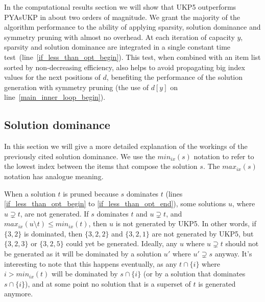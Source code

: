 \documentclass[runningheads,a4paper]{llncs}
\begin{document}
In the computational results section we will show that UKP5 outperforms PYAsUKP in about two orders of magnitude.
We grant the majority of the algorithm performance to the ability of applying sparsity, solution dominance and symmetry pruning with almost no overhead.
At each iteration of capacity \(y\), sparsity and solution dominance are integrated in a single constant time test~(line~\ref{if_less_than_opt_begin}).
This test, when combined with an item list sorted by non-decreasing efficiency, also helps to avoid propagating big index values for the next positions of \(d\), benefiting the performance of the solution generation with symmetry pruning (the use of \(d[y]\) on line~\ref{main_inner_loop_begin}).

\subsection{Solution dominance}

In this section we will give a more detailed explanation of the workings of the previously cited solution dominance. We use the \(min_{ix}(s)\) notation to refer to the lowest index between the items that compose the solution \(s\). The \(max_{ix}(s)\) notation has analogue meaning.

When a solution \(t\) is pruned because \(s\) dominates \(t\) (lines \ref{if_less_than_opt_begin} to \ref{if_less_than_opt_end}), some solutions \(u\), where \(u \supsetneq t\), are not generated. 
If \(s\) dominates \(t\) and \(u \supsetneq t\), and \(max_{ix}(u\setminus t) \leq min_{ix}(t)\), then \(u\) is not generated by UKP5. 
In other words, if \(\{3, 2\}\) is dominated, then \(\{3, 2, 2\}\) and \(\{3, 2, 1\}\) are not generated by UKP5, but \(\{3,2,3\}\) or \(\{3,2,5\}\) could yet be generated.
Ideally, any \(u\) where \(u \supsetneq t\) should not be generated as it will be dominated by a solution \(u'\) where \(u' \supsetneq s\) anyway. 
It's interesting to note that this happens eventually, as any \(t \cap \{i\}\) where \(i > min_{ix}(t)\) will be dominated by \(s \cap \{i\}\) (or by a solution that dominates \(s \cap \{i\}\)), and at some point no solution that is a superset of \(t\) is generated anymore.

\end{document}
